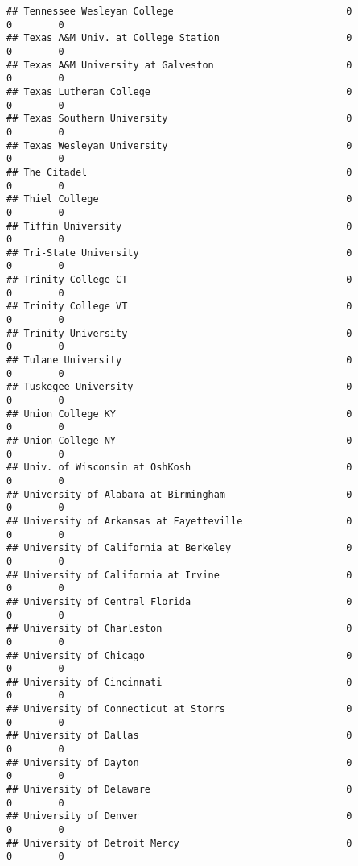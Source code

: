 \documentclass[
]{article}
\begin{document}
\begin{verbatim}
## Tennessee Wesleyan College                              0           0        0
## Texas A&M Univ. at College Station                      0           0        0
## Texas A&M University at Galveston                       0           0        0
## Texas Lutheran College                                  0           0        0
## Texas Southern University                               0           0        0
## Texas Wesleyan University                               0           0        0
## The Citadel                                             0           0        0
## Thiel College                                           0           0        0
## Tiffin University                                       0           0        0
## Tri-State University                                    0           0        0
## Trinity College CT                                      0           0        0
## Trinity College VT                                      0           0        0
## Trinity University                                      0           0        0
## Tulane University                                       0           0        0
## Tuskegee University                                     0           0        0
## Union College KY                                        0           0        0
## Union College NY                                        0           0        0
## Univ. of Wisconsin at OshKosh                           0           0        0
## University of Alabama at Birmingham                     0           0        0
## University of Arkansas at Fayetteville                  0           0        0
## University of California at Berkeley                    0           0        0
## University of California at Irvine                      0           0        0
## University of Central Florida                           0           0        0
## University of Charleston                                0           0        0
## University of Chicago                                   0           0        0
## University of Cincinnati                                0           0        0
## University of Connecticut at Storrs                     0           0        0
## University of Dallas                                    0           0        0
## University of Dayton                                    0           0        0
## University of Delaware                                  0           0        0
## University of Denver                                    0           0        0
## University of Detroit Mercy                             0           0        0

\end{verbatim}
\end{document}
